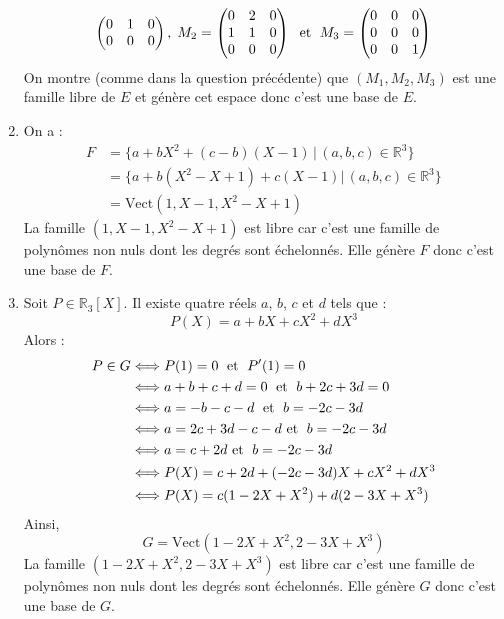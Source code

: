 \documentclass[a4paper,twoside,french,11pt]{VcCours}
\begin{document}
\begin{enumerate}
$$\begin{pmatrix}
0 & 1 & 0 \\
0 & 0 & 0
\end{pmatrix}, \; M_2 = \begin{pmatrix}
0 & 2 & 0 \\
1 & 1& 0 \\
0 & 0 & 0
\end{pmatrix} \; \hbox{ et } \; M_3 = \begin{pmatrix}
0 & 0 & 0 \\
0 & 0& 0 \\
0 & 0 & 1
\end{pmatrix}$$
On montre (comme dans la question précédente) que $(M_1,M_2,M_3)$ est une famille libre de $E$ et génère cet espace donc c'est une base de $E$.
\item On a :
\begin{align*}
F & = \lbrace a + bX^2 + (c-b)(X-1) \, \vert \, (a,b,c) \in \mathbb{R}^3 \rbrace \\
& = \lbrace a + b(X^2-X+1)+ c (X-1) \vert \, (a,b,c) \in \mathbb{R}^3 \rbrace \\ 
& = \textrm{Vect}(1,X-1,X^2-X+1)
\end{align*}
La famille $(1,X-1,X^2-X+1)$ est libre car c'est une famille de polynômes non nuls dont les degrés sont échelonnés. Elle génère $F$ donc c'est une base de $F$.
\item Soit $P \in \mathbb{R}_3[X]$. Il existe quatre réels $a$, $b$, $c$ et $d$ tels que :
$$ P(X) = a +bX+cX^2+dX^3$$
Alors :
\begin{align*}
P \in G & \Longleftrightarrow P(1)=0 \; \hbox{ et } \; P'(1)=0 \\
& \Longleftrightarrow a+b+c+d = 0 \; \hbox{ et } \; b+2c+3d = 0 \\
& \Longleftrightarrow a=-b-c-d \; \hbox{ et } \; b=-2c-3d \\
& \Longleftrightarrow a = 2c+3d-c-d  \hbox{ et } \; b=-2c-3d \\
& \Longleftrightarrow a = c +2d \hbox{ et } \; b=-2c-3d \\
& \Longleftrightarrow P(X) = c+2d + (-2c-3d)X + c X^2 + dX^3 \\
& \Longleftrightarrow P(X) = c (1-2X+X^2)+ d (2-3X+X^3)
\end{align*}
Ainsi,
$$ G = \textrm{Vect}(1-2X+X^2,2-3X+X^3)$$
La famille $(1-2X+X^2,2-3X+X^3)$ est libre car c'est une famille de polynômes non nuls dont les degrés sont échelonnés. Elle génère $G$ donc c'est une base de $G$.
\end{enumerate}
\end{document}
